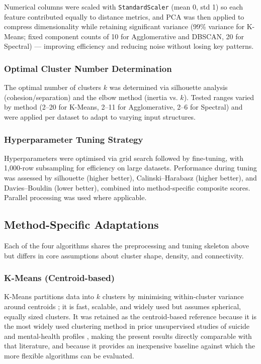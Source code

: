 Numerical columns were scaled with \texttt{StandardScaler} (mean 0, std 1) so each feature contributed equally to distance metrics, and PCA was then applied to compress dimensionality while retaining significant variance (99\% variance for K-Means; fixed component counts of 10 for Agglomerative and DBSCAN, 20 for Spectral) --- improving efficiency and reducing noise without losing key patterns.

\subsubsection{Optimal Cluster Number Determination}

The optimal number of clusters $k$ was determined via silhouette analysis (cohesion/separation) and the elbow method (inertia vs. $k$). Tested ranges varied by method (2--20 for K-Means, 2--11 for Agglomerative, 2--6 for Spectral) and were applied per dataset to adapt to varying input structures.

\subsubsection{Hyperparameter Tuning Strategy}

Hyperparameters were optimised via grid search followed by fine-tuning, with 1{,}000-row subsampling for efficiency on large datasets. Performance during tuning was assessed by silhouette (higher better), Calinski--Harabasz (higher better), and Davies--Bouldin (lower better), combined into method-specific composite scores. Parallel processing was used where applicable.

\subsection{Method-Specific Adaptations}

Each of the four algorithms shares the preprocessing and tuning skeleton above but differs in core assumptions about cluster shape, density, and connectivity.

\subsubsection{K-Means (Centroid-based)}

K-Means partitions data into $k$ clusters by minimising within-cluster variance around centroids \cite{ref13}; it is fast, scalable, and widely used but assumes spherical, equally sized clusters. It was retained as the centroid-based reference because it is the most widely used clustering method in prior unsupervised studies of suicide and mental-health profiles \cite{ref34, ref35, ref36}, making the present results directly comparable with that literature, and because it provides an inexpensive baseline against which the more flexible algorithms can be evaluated.

